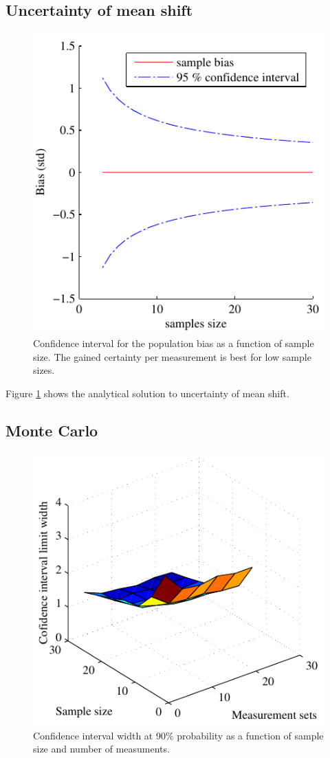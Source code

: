 \documentclass[aip,amsmath, reprint, author-year,nobalancelastpage]{revtex4-1}
\begin{document}
\subsection{Uncertainty of mean shift }
\begin{figure}[H]
\includegraphics{stats_bias_confidence.pdf}
\caption{\label{fig:bia_uncertainty}Confidence interval for the population bias as a function of sample size. The gained certainty per measurement is best for low sample sizes.}
\end{figure}

Figure \ref{fig:bia_uncertainty} shows the analytical solution to uncertainty of mean shift. 


\newpage
\subsection{Monte Carlo}
\begin{figure}[H]
\includegraphics{CLW90_surf.pdf}
\caption{\label{fig:CLW90_surf} Confidence interval width at 90\% probability as a function of sample size and number of measuments.}
\end{figure}
\end{document}
